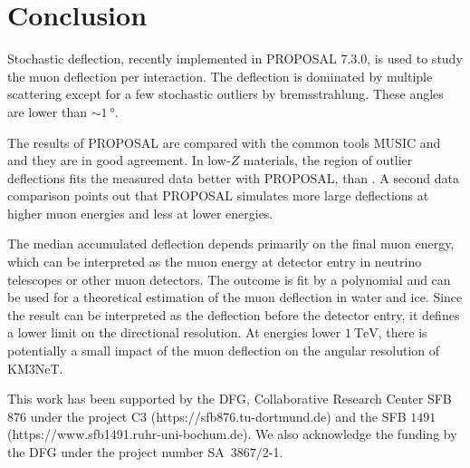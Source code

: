 \section{Conclusion}\label{sec:conclusion}

Stochastic deflection, recently implemented in PROPOSAL 7.3.0, is 
used to study the muon deflection per interaction. The deflection 
is dominated by multiple scattering except for a few stochastic 
outliers by bremsstrahlung. These angles are lower than
$\sim\SI{1}{\degree}$. 

The results of PROPOSAL are compared with the common tools MUSIC and 
 and they are in good agreement. In low-$Z$ materials, the region of outlier 
deflections fits the measured data better with PROPOSAL, than . 
A second data comparison points out that PROPOSAL simulates more 
large deflections at higher muon energies and less at lower 
energies. 

The median accumulated deflection depends primarily on the final muon energy, which can be interpreted as the muon energy at detector entry 
in neutrino telescopes or other muon detectors.
The outcome is fit by a polynomial and can be used for 
a theoretical estimation of the muon deflection in water and ice.
Since the result can be interpreted as the deflection before the detector entry, it defines a lower limit on the directional resolution.
At energies lower $\SI{1}{\tera\electronvolt}$, there is potentially a small impact of the muon deflection on the angular 
resolution of KM3NeT.


\begin{acknowledgement}
  This work has been supported by the DFG, Collaborative Research Center SFB $876$
  under the project C3 
  (https://sfb876.tu-dortmund.de) and the SFB $1491$ (https://www.sfb1491.ruhr-uni-bochum.de).
  We also acknowledge the funding by the DFG under the project number SA~$3867/$2-1.
\end{acknowledgement}

